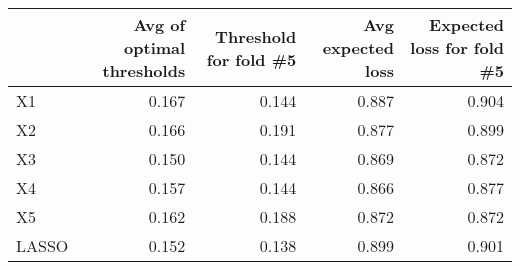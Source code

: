 
\begin{tabular}{lrrrr}
\toprule
  & Avg of optimal thresholds & Threshold for fold \#5 & Avg expected loss & Expected loss for fold \#5\\
\midrule
X1 & 0.167 & 0.144 & 0.887 & 0.904\\
X2 & 0.166 & 0.191 & 0.877 & 0.899\\
X3 & 0.150 & 0.144 & 0.869 & 0.872\\
X4 & 0.157 & 0.144 & 0.866 & 0.877\\
X5 & 0.162 & 0.188 & 0.872 & 0.872\\
LASSO & 0.152 & 0.138 & 0.899 & 0.901\\
\bottomrule
\end{tabular}